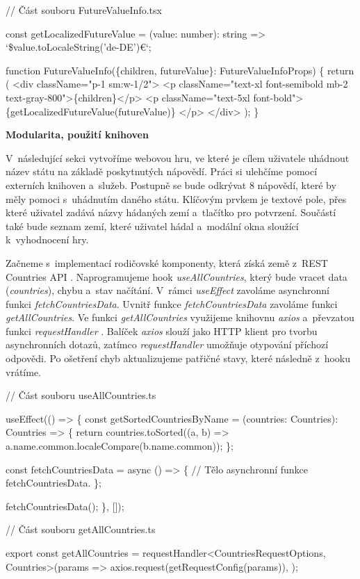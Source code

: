 \begin{prog}
// Část souboru FutureValueInfo.tsx

const getLocalizedFutureValue = (value: number): string => 
  `\${value.toLocaleString('de-DE')}€`;

function FutureValueInfo(\{children, futureValue\}: FutureValueInfoProps) \{
  return (
    <div className="p-1 sm:w-1/2">
      <p className="text-xl font-semibold mb-2 text-gray-800">\{children\}</p>
      <p className="text-5xl font-bold">
        \{getLocalizedFutureValue(futureValue)\}
      </p>
    </div>
  );
\}
\end{prog}

\begin{flushleft}
  \textbf{Modularita, použití knihoven}
\end{flushleft}

V~následující sekci vytvoříme webovou hru, ve které je cílem uživatele uhádnout název státu na základě poskytnutých nápovědí. Práci si ulehčíme pomocí externích knihoven a~služeb.
Postupně se bude odkrývat 8 nápovědí, které by měly pomoci s~uhádnutím daného státu. Klíčovým prvkem je textové pole, přes které uživatel zadává názvy hádaných zemí a~tlačítko pro potvrzení. 
Součástí také bude seznam zemí, které uživatel hádal a~modální okna sloužící k~vyhodnocení hry.

Začneme s~implementací rodičovské komponenty, která získá země z~REST Countries API \cite{restcountriesapi}. Naprogramujeme hook \emph{useAllCountries}, který bude vracet data (\emph{countries}), chybu a~stav načítání. 
V~rámci \emph{useEffect} zavoláme asynchronní funkci \emph{fetchCountriesData}. Uvnitř funkce \emph{fetchCountriesData} zavoláme funkci \emph{getAllCountries}. 
Ve funkci \emph{getAllCountries} využijeme knihovnu \emph{axios} \cite{axioslib} a~převzatou funkci \emph{requestHandler} \cite{axiosrequesthandler}. 
Balíček \emph{axios} slouží jako HTTP klient pro tvorbu asynchronních dotazů, zatímco \emph{requestHandler} umožňuje otypování příchozí odpovědi. Po ošetření chyb aktualizujeme patřičné stavy, které následně z~hooku vrátíme. 

\begin{prog}
// Část souboru useAllCountries.ts

useEffect(() => \{
  const getSortedCountriesByName = (countries: Countries): Countries => \{
    return countries.toSorted((a, b) => 
      a.name.common.localeCompare(b.name.common));
  \};

  const fetchCountriesData = async () => \{
    // Tělo asynchronní funkce fetchCountriesData.
  \};

  fetchCountriesData();
\}, []);

// Část souboru getAllCountries.ts

export const getAllCountries = 
  requestHandler<CountriesRequestOptions, Countries>(params =>
    axios.request(getRequestConfig(params)),
  );
\end{prog}

